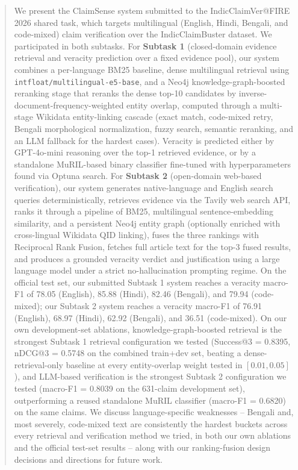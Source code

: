 \documentclass[
]{ceurart}
\begin{document}
\begin{abstract}
We present the ClaimSense system submitted to the IndicClaimVer@FIRE 2026
shared task, which targets multilingual (English, Hindi, Bengali, and
code-mixed) claim verification over the IndicClaimBuster dataset. We
participated in both subtasks. For \textbf{Subtask 1} (closed-domain
evidence retrieval and veracity prediction over a fixed evidence pool),
our system combines a per-language BM25 baseline, dense multilingual
retrieval using \texttt{intfloat/multilingual-e5-base}, and a Neo4j
knowledge-graph-boosted reranking stage that reranks the dense top-10
candidates by inverse-document-frequency-weighted entity overlap,
computed through a multi-stage Wikidata entity-linking cascade (exact
match, code-mixed retry, Bengali morphological normalization, fuzzy
search, semantic reranking, and an LLM fallback for the hardest cases).
Veracity is predicted either by GPT-4o-mini reasoning over the top-1
retrieved evidence, or by a standalone MuRIL-based binary classifier
fine-tuned with hyperparameters found via Optuna search. For
\textbf{Subtask 2} (open-domain web-based verification), our system
generates native-language and English search queries deterministically,
retrieves evidence via the Tavily web search API, ranks it through a
pipeline of BM25, multilingual sentence-embedding similarity, and a
persistent Neo4j entity graph (optionally enriched with cross-lingual
Wikidata QID linking), fuses the three rankings with Reciprocal Rank
Fusion, fetches full article text for the top-3 fused results, and
produces a grounded veracity verdict and justification using a large
language model under a strict no-hallucination prompting regime. On the
official test set, our submitted Subtask 1 system reaches a veracity
macro-F1 of 78.05 (English), 85.88 (Hindi), 82.46 (Bengali), and 79.94
(code-mixed); our Subtask 2 system reaches a veracity macro-F1 of 76.91
(English), 68.97 (Hindi), 62.92 (Bengali), and 36.51 (code-mixed). On our
own development-set ablations, knowledge-graph-boosted retrieval is the
strongest Subtask 1 retrieval configuration we tested (Success@3 =
0.8395, nDCG@3 = 0.5748 on the combined train+dev set, beating a
dense-retrieval-only baseline at every entity-overlap weight tested in
$[0.01, 0.05]$), and LLM-based verification is the strongest Subtask 2
configuration we tested (macro-F1 = 0.8039 on the 631-claim development
set), outperforming a reused standalone MuRIL classifier (macro-F1 =
0.6820) on the same claims. We discuss language-specific weaknesses --
Bengali and, most severely, code-mixed text are consistently the
hardest buckets across every retrieval and verification method we
tried, in both our own ablations and the official test-set results --
along with our ranking-fusion design decisions and directions for
future work.
\end{abstract}
\end{document}
